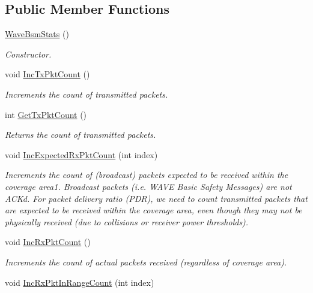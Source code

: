 \subsection*{Public Member Functions}
\begin{DoxyCompactItemize}
\item 
\hyperlink{classns3_1_1WaveBsmStats_a20a10d4897feee2e8dd3451e5d8d9f75}{Wave\+Bsm\+Stats} ()
\begin{DoxyCompactList}\small\item\em Constructor. \end{DoxyCompactList}\item 
void \hyperlink{classns3_1_1WaveBsmStats_a0d44649d50a335003c4e26e29ed618d9}{Inc\+Tx\+Pkt\+Count} ()
\begin{DoxyCompactList}\small\item\em Increments the count of transmitted packets. \end{DoxyCompactList}\item 
int \hyperlink{classns3_1_1WaveBsmStats_ac03b2904a5b3e82976c673408d1252ac}{Get\+Tx\+Pkt\+Count} ()
\begin{DoxyCompactList}\small\item\em Returns the count of transmitted packets. \end{DoxyCompactList}\item 
void \hyperlink{classns3_1_1WaveBsmStats_a90bf00990db8a702048402483c3c7b38}{Inc\+Expected\+Rx\+Pkt\+Count} (int index)
\begin{DoxyCompactList}\small\item\em Increments the count of (broadcast) packets expected to be received within the coverage area1. Broadcast packets (i.\+e. W\+A\+VE Basic Safety Messages) are not A\+CK\textquotesingle{}d. For packet delivery ratio (P\+DR), we need to count transmitted packets that are expected to be received within the coverage area, even though they may not be physically received (due to collisions or receiver power thresholds). \end{DoxyCompactList}\item 
void \hyperlink{classns3_1_1WaveBsmStats_a94e0e5991452df803819c60527a9c91f}{Inc\+Rx\+Pkt\+Count} ()
\begin{DoxyCompactList}\small\item\em Increments the count of actual packets received (regardless of coverage area). \end{DoxyCompactList}\item 
void \hyperlink{classns3_1_1WaveBsmStats_aa55053fc93d2db67e42a75a8dd68ad57}{Inc\+Rx\+Pkt\+In\+Range\+Count} (int index)

\end{DoxyCompactItemize}
